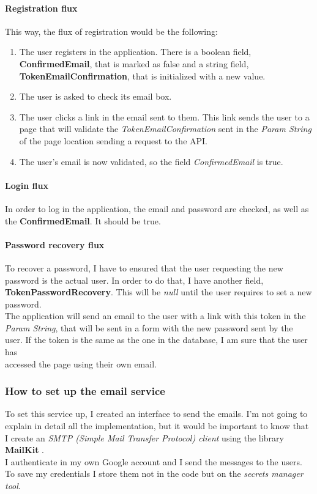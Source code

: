     \paragraph{Registration flux}
    This way, the flux of registration would be the following:
    \begin{enumerate}
        \item The user registers in the application. There is a boolean field, \textbf{ConfirmedEmail}, that is marked as false and a string field, \textbf{TokenEmailConfirmation}, that is initialized with a new value.
        \item The user is asked to check its email box.
        \item The user clicks a link in the email sent to them. This link sends the user to a page that will validate the \textit{TokenEmailConfirmation} sent in the \textit{Param String} of the page location sending a request to the API.
        \item The user's email is now validated, so the field \textit{ConfirmedEmail} is true. 
    \end{enumerate}

    \paragraph{Login flux}
    In order to log in the application, the email and password are checked, as well as the \textbf{ConfirmedEmail}. It should be true.

    \paragraph{Password recovery flux}
    To recover a password, I have to ensured that the user requesting the new password is the actual user. In order to do that, I have another field, \textbf{TokenPasswordRecovery}. This will be \textit{null} until the user requires to set a new password. \\
    The application will send an email to the user with a link with this token in the \textit{Param String}, that will be sent in a form with the new password sent by the user. If the token is the same as the one in the database, I am sure that the user has \\
    accessed the page using their own email.

    \subsubsection{How to set up the email service}
    To set this service up, I created an interface to send the emails. I'm not going to explain in detail all the implementation, but it would be important to know that I create an \textit{SMTP (Simple Mail Transfer Protocol) client} using the library \textbf{MailKit} \cite{MailKit}. \\
    I authenticate in my own Google account and I send the messages to the users. To save my credentials I store them not in the code but on the \textit{secrets manager tool}.

